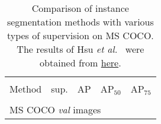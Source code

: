\documentclass[final]{cvpr}
\begin{document}
\begin{table}[t]
\renewcommand{\arraystretch}{0.97}
\centering
\caption{Comparison of instance segmentation methods with various types of supervision on MS COCO. The results of Hsu \textit{et al.}~\cite{hsu2019weakly} were obtained from \href{https://media.nips.cc/nipsbooks/nipspapers/paper_files/nips32/reviews/3565-AuthorFeedback.pdf}{here}.}
\vspace{-0.8em}
  \label{instance_coco}
  \begin{threeparttable}
  \begin{tabular}{l @{\hskip 0.08in} c@{\hskip 0.12in}c @{\hskip 0.12in} c @{\hskip 0.1in}c}
    \Xhline{1pt}\\[-0.95em]
     Method   & sup.    & AP   & AP$_{50}$ & AP$_{75}$ \\
\hline\hline
    \\[-0.9em]
    
    \multicolumn{4}{l}{MS COCO \textit{val} images} \\
     

\end{tabular}
\end{threeparttable}
\end{table}
\end{document}
